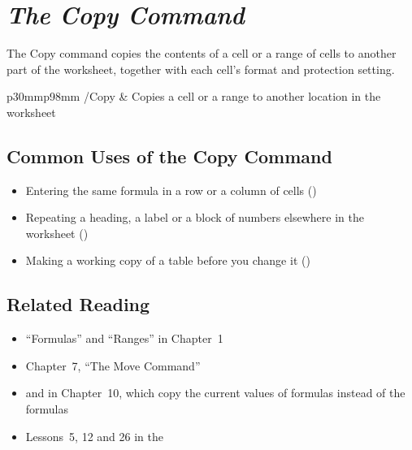 \chapter[The Copy Command]{\textit{The Copy Command}}


The Copy command copies the contents of a cell or a range of cells to
another part of the worksheet, together with each cell's format and
protection setting.

\begin{LotTable}{p{30mm}p{98mm}}
/Copy & Copies a cell or a range to another location in the worksheet\LotEnd
\end{LotTable}

\section{Common Uses of the Copy Command}
\begin{itemize}
\item Entering the same formula in a row or a column of cells
  ()
\item Repeating a heading, a label or a block of numbers elsewhere in the
  worksheet ()
\item Making a working copy of a table before you change it
  ()
\end{itemize}

\section{Related Reading}
\begin{itemize}
\item ``Formulas'' and ``Ranges'' in Chapter~1
\item Chapter~7, ``The Move Command''
\item {} and  in Chapter~10,
  which copy the current values of formulas instead of the formulas
\item Lessons~5, 12 and 26 in the 
\end{itemize}

